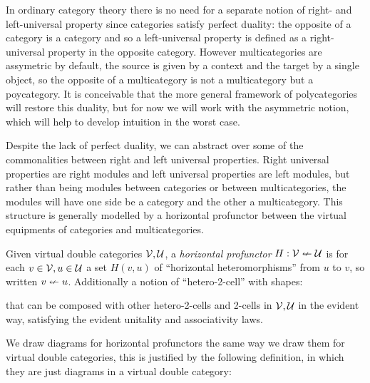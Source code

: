 \documentclass{article}
\begin{document}
In ordinary category theory there is no need for a separate notion of
right- and left-universal property since categories satisfy perfect
duality: the opposite of a category is a category and so a
left-universal property is defined as a right-universal property in
the opposite category.
%
However multicategories are assymetric by default, the source is given
by a context and the target by a single object, so the opposite of a
multicategory is not a multicategory but a poycategory.
%
It is conceivable that the more general framework of polycategories
will restore this duality, but for now we will work with the
asymmetric notion, which will help to develop intuition in the worst
case.

Despite the lack of perfect duality, we can abstract over some of the
commonalities between right and left universal properties.
%
Right universal properties are right modules and left universal
properties are left modules, but rather than being modules between
categories or between multicategories, the modules will have one side
be a category and the other a multicategory.
%
This structure is generally modelled by a horizontal profunctor
between the virtual equipments of categories and multicategories.

\begin{definition}
  Given virtual double categories $\mathcal{V},\mathcal{U}$, a
  \emph{horizontal profunctor} $H : \mathcal V \nleftarrow \mathcal U$ is for
  each $v \in \mathcal V, u \in \mathcal U$ a set $H(v,u)$ of ``horizontal
  heteromorphisms'' from $u$ to $v$, so written $v \nleftarrow u$.
  Additionally a notion of ``hetero-2-cell'' with shapes:


  that can be composed with other hetero-2-cells and 2-cells in $\mathcal
  V, \mathcal U$ in the evident way, satisfying the evident unitality and
  associativity laws.
\end{definition}

We draw diagrams for horizontal profunctors the same way we draw them
for virtual double categories, this is justified by the following
definition, in which they are just diagrams in a virtual double category:
\end{document}
